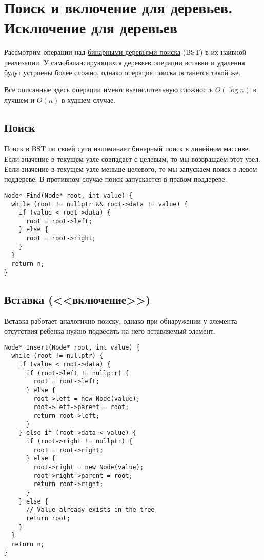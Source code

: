 \section{Поиск и включение для деревьев. Исключение для деревьев}
\label{sec:tree-node-ops}
Рассмотрим операции над \hyperref[def:bst]{бинарными деревьями поиска} (BST) в их наивной реализации.
У самобалансирующихся деревьев операции вставки и удаления будут устроены более сложно, однако
операция поиска останется такой же.

Все описанные здесь операции имеют вычислительную сложность $O(\log n)$ в лучшем
и $O(n)$ в худшем случае.

\subsection{Поиск}
Поиск в BST по своей сути напоминает бинарный поиск в линейном массиве.
Если значение в текущем узле совпадает с целевым, то мы возвращаем этот узел.
Если значение в текущем узле меньше целевого, то мы запускаем поиск в левом поддереве.
В противном случае поиск запускается в правом поддереве.
\begin{verbatim}
Node* Find(Node* root, int value) {
  while (root != nullptr && root->data != value) {
    if (value < root->data) {
      root = root->left;
    } else {
      root = root->right;
    }
  }
  return n;
}
\end{verbatim}
\subsection{Вставка (<<включение>>)}
Вставка работает аналогично поиску, однако при обнаружении у элемента отсутствия ребенка
нужно подвесить на него вставляемый элемент.
\begin{verbatim}
Node* Insert(Node* root, int value) {
  while (root != nullptr) {
    if (value < root->data) {
      if (root->left != nullptr) {
        root = root->left;
      } else {
        root->left = new Node(value);
        root->left->parent = root;
        return root->left;
      }
    } else if (root->data < value) {
      if (root->right != nullptr) {
        root = root->right;
      } else {
        root->right = new Node(value);
        root->right->parent = root;
        return root->right;
      }
    } else {
      // Value already exists in the tree
      return root;
    }
  }
  return n;
}
\end{verbatim}
